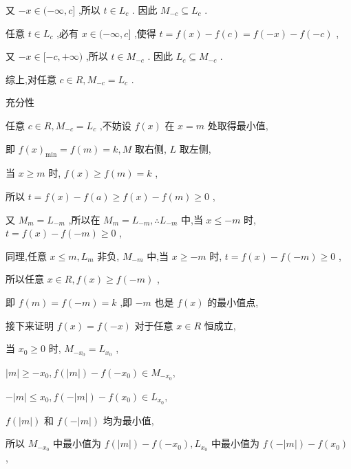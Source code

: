\documentclass[10pt]{article}
\begin{document}
又 \(- x \in  ( - \infty ,c\rbrack\) ,所以 \(t \in  {L}_{c}\) . 因此 \({M}_{-c} \subseteq  {L}_{c}\) .

任意 \(t \in  {L}_{c}\) ,必有 \(x \in  ( - \infty ,c\rbrack\) ,使得 \(t = f\left( x\right)  - f\left( c\right)  = f\left( {-x}\right)  - f\left( {-c}\right)\) ,

又 \(- x \in  \lbrack  - c, + \infty )\) ,所以 \(t \in  {M}_{-c}\) . 因此 \({L}_{c} \subseteq  {M}_{-c}\) .

综上,对任意 \(c \in  R,{M}_{-c} = {L}_{c}\) .

充分性

任意 \(c \in  R,{M}_{-c} = {L}_{c}\) ,不妨设 \(f\left( x\right)\) 在 \(x = m\) 处取得最小值,

即 \(f{\left( x\right) }_{\min } = f\left( m\right)  = k,M\) 取右侧, \(L\) 取左侧,

当 \(x \geq  m\) 时, \(f\left( x\right)  \geq  f\left( m\right)  = k\) ,

所以 \(t = f\left( x\right)  - f\left( a\right)  \geq  f\left( x\right)  - f\left( m\right)  \geq  0\) ,

又 \({M}_{m} = {L}_{-m}\) ,所以在 \({M}_{m} = {L}_{-m},\therefore {L}_{-m}\) 中,当 \(x \leq   - m\) 时, \(t = f\left( x\right)  - f\left( {-m}\right)  \geq  0\) ,

同理,任意 \(x \leq  m,{L}_{m}\) 非负, \({M}_{-m}\) 中,当 \(x \geq   - m\) 时, \(t = f\left( x\right)  - f\left( {-m}\right)  \geq  0\) ,

所以任意 \(x \in  R,f\left( x\right)  \geq  f\left( {-m}\right)\) ,

即 \(f\left( m\right)  = f\left( {-m}\right)  = k\) ,即 \(- m\) 也是 \(f\left( x\right)\) 的最小值点,

接下来证明 \(f\left( x\right)  = f\left( {-x}\right)\) 对于任意 \(x \in  R\) 恒成立,

当 \({x}_{0} \geq  0\) 时, \({M}_{-{x}_{0}} = {L}_{{x}_{0}}\) ,

\(\left| m\right|  \geq   - {x}_{0},f\left( \left| m\right| \right)  - f\left( {-{x}_{0}}\right)  \in  {M}_{-{x}_{0}},\)

\(- \left| m\right|  \leq  {x}_{0},f\left( {-\left| m\right| }\right)  - f\left( {x}_{0}\right)  \in  {L}_{{x}_{0}},\)

\(f\left( \left| m\right| \right)\) 和 \(f\left( {-\left| m\right| }\right)\) 均为最小值,

所以 \({M}_{-{x}_{0}}\) 中最小值为 \(f\left( \left| m\right| \right)  - f\left( {-{x}_{0}}\right) ,{L}_{{x}_{0}}\) 中最小值为 \(f\left( {-\left| m\right| }\right)  - f\left( {x}_{0}\right)\) ,
\end{document}
